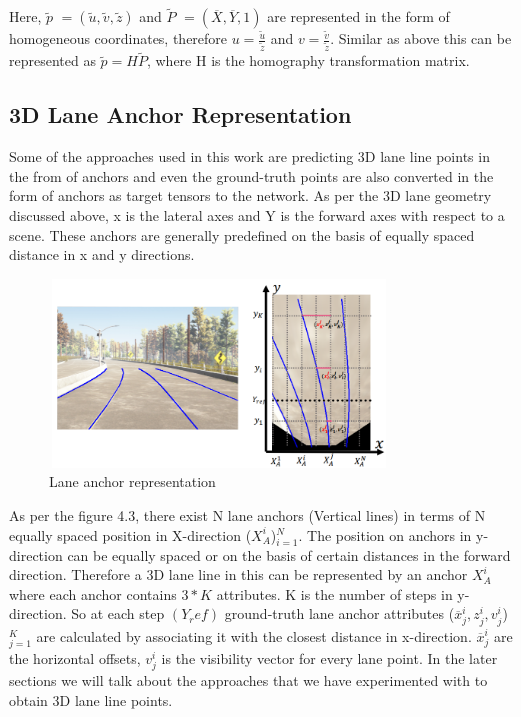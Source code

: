     Here, \textbf{$\widetilde{p}$} $= (\widetilde{u}, \widetilde{v}, \widetilde{z})$ and  \textbf{$\widetilde{P}$} $= (\overline{X},\overline{Y},1 )$ are represented in the form of homogeneous coordinates, therefore $u = \frac{\widetilde{u}} {\widetilde{z}} $ and $v = \frac{\widetilde{v}} {\widetilde{z}} $. Similar as above this can be represented as \textbf{$\widetilde{p} = H\widetilde{P}$}, where H is the homography transformation matrix. 
    
    \subsection{3D Lane Anchor Representation}
    Some of the approaches used in this work are predicting 3D lane line points in the from of anchors and even the ground-truth points are also converted in the form of anchors as target tensors to the network.  As per the 3D lane geometry discussed above, x is the lateral axes and Y is the forward axes with respect to a scene. These anchors are generally predefined on the basis of equally spaced distance in x and y directions. 
    
     \begin{figure}[h]
    \centering
    \includegraphics[width=9cm, height=5cm]{images/anchor_3Dlane.png}
    \caption{Lane anchor representation \cite{guo2020gen}}
    \end{figure}
    
    As per the figure 4.3, there exist N lane anchors (Vertical lines) in terms of N equally spaced position in X-direction ($X^{i}_{A}$)$^{N}_{i=1}$. The position on anchors in y-direction can be equally spaced or on the basis of certain distances in the forward direction. Therefore a 3D lane line in this can be represented by an anchor $X^{i}_{A}$ where each anchor contains $3*K$ attributes. K is the number of steps in y-direction. So at each step $(Y_ref)$ ground-truth lane anchor attributes ($\overline{x}^{i}_{j},z^{i}_{j},v^{i}_{j}$)$^{K}_{j=1}$ are calculated by associating it with the closest distance in x-direction. $\overline{x}^{i}_{j}$ are the horizontal offsets, $v^{i}_{j}$ is the visibility vector for every lane point.  In the later sections we will talk about the approaches that we have experimented with to obtain 3D lane line points. 
        

